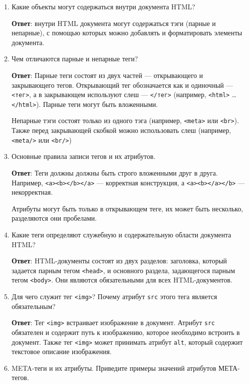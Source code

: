 \documentclass[a4paper, 14pt]{extarticle}
\begin{document}
\begin{enumerate}[leftmargin=*]
  \item Какие объекты могут содержаться внутри документа HTML?

        \textbf{Ответ}: внутри HTML документа могут содержаться тэги (парные и
        непарные), с помощью которых можно добавлять и форматировать элементы
        документа.
  \item Чем отличаются парные и непарные теги?

        \textbf{Ответ}: Парные теги состоят из двух частей --- открывающего и
        закрывающего тегов. Открывающий тег обозначается как и одиночный ---
        \texttt{<тег>}, а в закрывающем используют слеш --- \texttt{</тег>}
        (например, \texttt{<html>} \ldots \texttt{</html>}). Парные теги могут
        быть вложенными.

        Непарные тэги состоят только из одного тэга (например, \texttt{<meta>}
        или \texttt{<br>}). Также перед закрывающей скобкой можно использовать
        слеш (например, \texttt{<meta/>} или \texttt{<br/>})
  \item Основные правила записи тегов и их атрибутов.

        \textbf{Ответ}: Теги должны должны быть строго вложенными друг в друга.
        Например, \texttt{<a><b></b></a>} --- корректная конструкция, а
        \texttt{<a><b></a></b>} --- некорректная.

        Атрибуты могут быть только в открывающем теге, их может быть несколько,
        разделяются они пробелами.
  \item Какие теги определяют служебную и содержательную области документа
        HTML?

        \textbf{Ответ}: HTML-документы состоят из двух разделов: заголовка,
        который задается парным тегом \texttt{<head>}, и основного раздела,
        задающегося парным тегом \texttt{<body>}. Они являются обязательными
        для всех HTML-документов.
  \item Для чего служит тег \texttt{<img>}? Почему атрибут \texttt{src} этого
        тега является обязательным?

        \textbf{Ответ}: Тег \texttt{<img>} встраивает изображение в документ.
        Атрибут \texttt{src} обязателен и содержит путь к изображению, которое
        необходимо встроить в документ. Также тег \texttt{<img>} может
        принимать атрибут \texttt{alt}, который содержит текстовое описание
        изображения.
  \item META-теги и их атрибуты. Приведите примеры значений атрибутов
        МЕТА-тегов.


\end{enumerate}
\end{document}
